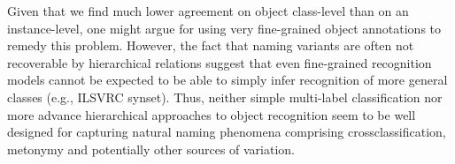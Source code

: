 Given that we find much lower agreement on object class-level than on an instance-level, one might argue for using very fine-grained object annotations to remedy this problem. 
However, the fact that naming variants are often not recoverable by hierarchical relations suggest that even fine-grained recognition models cannot be expected to be able to simply infer recognition of more general classes (e.g., ILSVRC synset). Thus, neither simple multi-label classification nor more advance hierarchical approaches to object recognition seem to be well designed for capturing natural naming phenomena comprising crossclassification, metonymy and potentially other sources of variation.

  



